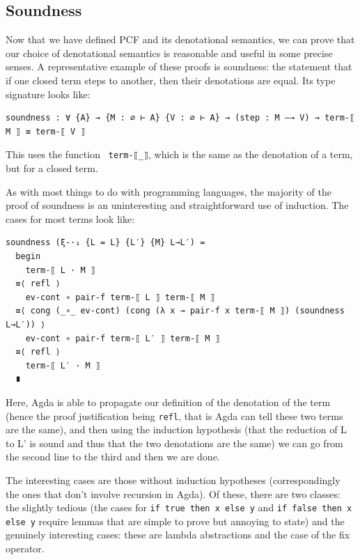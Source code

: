 \documentclass[12pt,a4paper,twoside,openright]{report}
\begin{document}
\subsection{Soundness}
Now that we have defined PCF and its denotational semantics, we can prove that our choice of denotational semantics is reasonable and useful in some precise senses. A representative example of these proofs is soundness: the statement that if one 
closed term steps to another, then their denotations are equal. Its type signature looks like:
\begin{verbatim}
soundness : ∀ {A} → {M : ∅ ⊢ A} {V : ∅ ⊢ A} → (step : M —→ V) → term-⟦ M ⟧ ≡ term-⟦ V ⟧
\end{verbatim}
This uses the function \texttt{ term-⟦\_⟧}, which is the same as the denotation of a term, but for a closed term. 

As with most things to do with programming languages, the majority of the proof of soundness is an uninteresting and straightforward use of induction. The cases for most terms look like:
\begin{verbatim}
soundness (ξ-·₁ {L = L} {L′} {M} L→L′) =
  begin
    term-⟦ L · M ⟧
  ≡⟨ refl ⟩
    ev-cont ∘ pair-f term-⟦ L ⟧ term-⟦ M ⟧
  ≡⟨ cong (_∘_ ev-cont) (cong (λ x → pair-f x term-⟦ M ⟧) (soundness L→L′)) ⟩
    ev-cont ∘ pair-f term-⟦ L′ ⟧ term-⟦ M ⟧
  ≡⟨ refl ⟩
    term-⟦ L′ · M ⟧
  ∎
\end{verbatim}
Here, Agda is able to propagate our definition of the denotation of the term (hence the proof justification being \texttt{refl}, that is Agda can tell these two terms are the same), and then using the induction hypothesis (that the reduction of L to L' is sound and thus that the two denotations are the same) we can go from the second line to the third and then we are done. 

The interesting cases are those without induction hypotheses (correspondingly the ones that don't involve recursion in Agda). Of these, there are two classes: the slightly tedious (the cases for \texttt{if true then x else y} and \texttt{if false then x else y} require lemmas that are simple to prove but annoying to state) and the genuinely interesting cases: these are lambda abstractions and the case of the fix operator.
\end{document}
